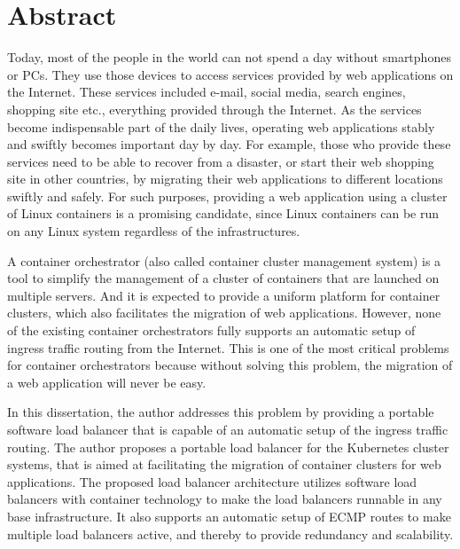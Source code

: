 \chapter*{Abstract}

Today, most of the people in the world can not spend a day without smartphones or PCs.
They use those devices to access services provided by web applications on the Internet.
These services included e-mail, social media, search engines, shopping site etc., everything provided through the Internet.
As the services become indispensable part of the daily lives, operating web applications stably and swiftly becomes important day by day.
For example, those who provide these services need to be able to recover from a disaster, or start their web shopping site in other countries,
by migrating their web applications to different locations swiftly and safely.
For such purposes, providing a web application using a cluster of Linux containers is a promising candidate, since Linux containers can be run on any Linux system regardless of the infrastructures.


A container orchestrator (also called container cluster management system) is a tool to simplify the management of a cluster of containers that are launched on multiple servers.
And it is expected to provide a uniform platform for container clusters, which also facilitates the migration of web applications.
However, none of the existing container orchestrators fully supports an automatic setup of ingress traffic routing from the Internet.
This is one of the most critical problems for container orchestrators because without solving this problem, the migration of a web application will never be easy.

In this dissertation, the author addresses this problem by providing a portable software load balancer that is capable of an automatic setup of the ingress traffic routing.
The author proposes a portable load balancer for the Kubernetes cluster systems, that is aimed at facilitating the migration of container clusters for web applications.
The proposed load balancer architecture utilizes software load balancers with container technology to make the load balancers runnable in any base infrastructure. 
It also supports an automatic setup of ECMP routes to make multiple load balancers active, and thereby to provide redundancy and scalability.

